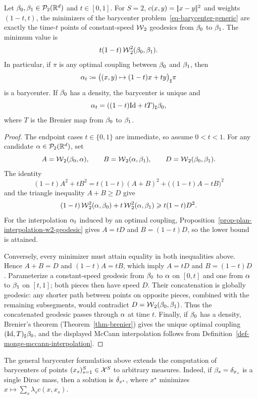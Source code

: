 \begin{prop}\label{prop-two-measure-barycenter-geodesic}
	Let $\beta_0,\beta_1\in\mathcal{P}_2(\mathbb{R}^d)$ and $t\in[0,1]$. For $S=2$, $c(x,y)=|\!| x-y |\!|^2$ and weights $(1-t,t)$, the minimizers of the barycenter problem~\eqref{eq-barycenter-generic} are exactly the time-$t$ points of constant-speed $\operatorname{\mathcal{W}}_2$ geodesics from $\beta_0$ to $\beta_1$. The minimum value is
	\[
		t(1-t)\operatorname{\mathcal{W}}_2^2(\beta_0,\beta_1).
	\]
	In particular, if $\pi$ is any optimal coupling between $\beta_0$ and $\beta_1$, then
	\[
		\alpha_t
		\coloneqq
		\bigl((x,y)\mapsto(1-t)x+ty\bigr)_\sharp\pi
	\]
	is a barycenter. If $\beta_0$ has a density, the barycenter is unique and
	\[
		\alpha_t=((1-t)\mathrm{Id}+tT)_\sharp\beta_0,
	\]
	where $T$ is the Brenier map from $\beta_0$ to $\beta_1$.
\end{prop}
\begin{proof}
	The endpoint cases $t\in\{0,1\}$ are immediate, so assume $0<t<1$. For any candidate $\alpha\in\mathcal{P}_2(\mathbb{R}^d)$, set
	\[
		A=\operatorname{\mathcal{W}}_2(\beta_0,\alpha),
		\qquad
		B=\operatorname{\mathcal{W}}_2(\alpha,\beta_1),
		\qquad
		D=\operatorname{\mathcal{W}}_2(\beta_0,\beta_1).
	\]
	The identity
	\[
		(1-t)A^2+tB^2
		=
		t(1-t)(A+B)^2+\bigl((1-t)A-tB\bigr)^2
	\]
	and the triangle inequality $A+B\geq D$ give
	\[
		(1-t)\operatorname{\mathcal{W}}_2^2(\alpha,\beta_0)
		+t\operatorname{\mathcal{W}}_2^2(\alpha,\beta_1)
		\geqslant
		t(1-t)D^2.
	\]
	For the interpolation $\alpha_t$ induced by an optimal coupling, Proposition~\ref{prop-plan-interpolation-w2-geodesic} gives $A=tD$ and $B=(1-t)D$, so the lower bound is attained.

	Conversely, every minimizer must attain equality in both inequalities above. Hence $A+B=D$ and $(1-t)A=tB$, which imply $A=tD$ and $B=(1-t)D$. Parameterize a constant-speed geodesic from $\beta_0$ to $\alpha$ on $[0,t]$ and one from $\alpha$ to $\beta_1$ on $[t,1]$; both pieces then have speed $D$. Their concatenation is globally geodesic: any shorter path between points on opposite pieces, combined with the remaining subsegments, would contradict $D=\operatorname{\mathcal{W}}_2(\beta_0,\beta_1)$. Thus the concatenated geodesic passes through $\alpha$ at time $t$. Finally, if $\beta_0$ has a density, Brenier's theorem (Theorem~\ref{thm-brenier}) gives the unique optimal coupling $(\mathrm{Id},T)_\sharp\beta_0$, and the displayed McCann interpolation follows from Definition~\ref{def-monge-mccann-interpolation}.
\end{proof}
\begin{example}
	The general barycenter formulation above extends the computation of barycenters of points $(x_s)_{s=1}^S \in \mathcal{X}^S$ to arbitrary measures. Indeed, if $\beta_s=\delta_{x_s}$ is a single Dirac mass, then a solution is $\delta_{x^\star}$, where $x^\star$ minimizes $x\mapsto\sum_s\lambda_s c(x,x_s)$.
\end{example}

